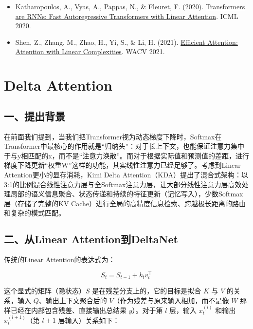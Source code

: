 \vspace{0.25em}
\begin{itemize}
\tightlist
\item
  Katharopoulos, A., Vyas, A., Pappas, N., \& Fleuret, F. (2020). \href{https://arxiv.org/abs/2006.16236}{Transformers are RNNs: Fast Autoregressive Transformers with Linear Attention}. ICML 2020.
\item
  Shen, Z., Zhang, M., Zhao, H., Yi, S., \& Li, H. (2021). \href{https://arxiv.org/abs/1812.01243}{Efficient Attention: Attention with Linear Complexities}. WACV 2021.
\end{itemize}

\clearpage

\hypertarget{delta-attention}{%
\section{Delta Attention}\label{delta-attention}}

\hypertarget{ux4e00ux63d0ux51faux80ccux666f-1}{%
\subsection{一、提出背景}\label{ux4e00ux63d0ux51faux80ccux666f-1}}

在前面我们提到，当我们把Transformer视为动态梯度下降时，Softmax在Transformer中最核心的作用就是``归纳头''：对于长上下文，也能保证注意力集中于与y相匹配的x，而不是``注意力涣散''。而对于根据实际值和预测值的差距，进行梯度下降更新``权重W''这样的功能，其实线性注意力已经足够了。考虑到Linear Attention更小的显存消耗，Kimi Delta Attention（KDA）提出了混合式架构：以3:1的比例混合线性注意力层与全Softmax注意力层，让大部分线性注意力层高效处理局部的语义信息聚合、状态传递和持续的特征更新（记忆写入），少数Softmax层（存储了完整的KV Cache）进行全局的高精度信息检索、跨越极长距离的路由和复杂的模式匹配。

\hypertarget{ux4e8cux4ecelinear-attentionux5230deltanet}{%
\subsection{二、从Linear Attention到DeltaNet}\label{ux4e8cux4ecelinear-attentionux5230deltanet}}

传统的Linear Attention的表达式为：

\[
S_t=S_{t-1}+k_tv_t^\top
\]

这个显式的矩阵（隐状态）\(S\) 是在残差分支上的，它的目标是拟合 \(K\) 与 \(V\) 的关系，输入 \(Q\)、输出上下文聚合后的 \(V\)（作为残差与原来输入相加，而不是像 \(W\) 那样已经在内部包含残差、直接输出总结果 \(y\)）。对于第 \(l\) 层，输入 \(x_t^{(l)}\) 和输出 \(x_t^{(l+1)}\)（第 \(l+1\) 层输入）关系如下：

